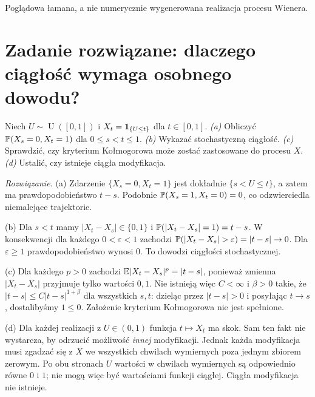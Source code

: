 \begin{center}
\par\smallskip\small Poglądowa łamana, a nie numerycznie wygenerowana realizacja procesu Wienera.
\end{center}

\section{Zadanie rozwiązane: dlaczego ciągłość wymaga osobnego dowodu?}
\begin{zadanie}
Niech $U\sim\operatorname{U}([0,1])$ i
$X_t=\mathbf{1}_{\{U\le t\}}$ dla $t\in[0,1]$.
\emph{(a)} Obliczyć $\mathbb{P}(X_s=0,X_t=1)$ dla $0\le s<t\le1$.
\emph{(b)} Wykazać stochastyczną ciągłość.
\emph{(c)} Sprawdzić, czy kryterium Kołmogorowa może
zostać zastosowane do procesu $X$.
\emph{(d)} Ustalić, czy istnieje ciągła modyfikacja.

\emph{Rozwiązanie.}
(a) Zdarzenie $\{X_s=0,X_t=1\}$ jest dokładnie
$\{s<U\le t\}$, a zatem ma prawdopodobieństwo $t-s$.
Podobnie $\mathbb{P}(X_s=1,X_t=0)=0$, co odzwierciedla
niemalejące trajektorie.

(b) Dla $s<t$ mamy $|X_t-X_s|\in\{0,1\}$ i
$\mathbb{P}(|X_t-X_s|=1)=t-s$. W konsekwencji dla każdego
$0<\varepsilon<1$ zachodzi
$\Prob(|X_t-X_s|>\varepsilon)=|t-s|\to0$.
Dla $\varepsilon\ge1$ prawdopodobieństwo wynosi $0$.
To dowodzi ciągłości stochastycznej.

(c) Dla każdego $p>0$ zachodzi
$\mathbb{E}|X_t-X_s|^p=|t-s|$, ponieważ zmienna
$|X_t-X_s|$ przyjmuje tylko wartości $0,1$.
Nie istnieją więc $C<\infty$ i $\beta>0$ takie, że
$|t-s|\le C|t-s|^{1+\beta}$ dla wszystkich $s,t$:
dzieląc przez $|t-s|>0$ i posyłając $t\to s$,
dostalibyśmy $1\le0$. Założenie kryterium
Kołmogorowa nie jest spełnione.

(d) Dla każdej realizacji z $U\in(0,1)$ funkcja
$t\mapsto X_t$ ma skok. Sam ten fakt nie wystarcza,
by odrzucić możliwość \emph{innej} modyfikacji.
Jednak każda modyfikacja musi zgadzać się z $X$
we wszystkich chwilach wymiernych poza jednym zbiorem
zerowym. Po obu stronach $U$ wartości w chwilach
wymiernych są odpowiednio równe $0$ i $1$; nie
mogą więc być wartościami funkcji ciągłej.
Ciągła modyfikacja nie istnieje.
\end{zadanie}


